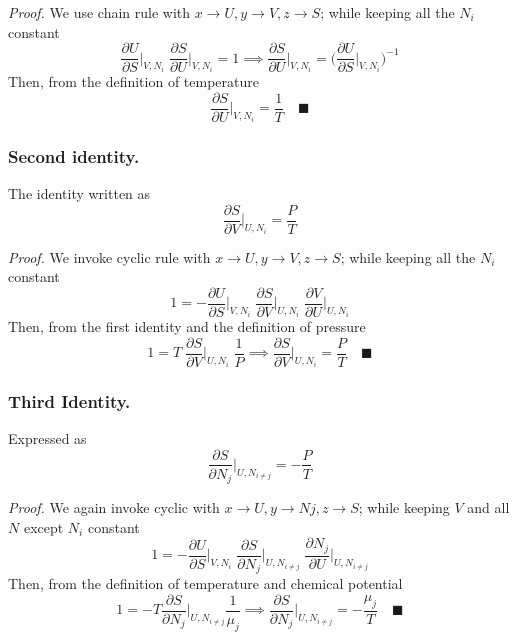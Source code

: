 \documentclass[../../../main.tex]{subfiles}
\begin{document}
\emph{Proof.} We use chain rule with $x\rightarrow U,  y \rightarrow V ,z \rightarrow S$; while keeping all the $N_i$ constant
\begin{equation*}
    \frac{\partial U}{\partial S}\bigg|_{V,N_i}\;\frac{\partial S}{\partial U}\bigg|_{V,N_i}=1\implies
    \frac{\partial S}{\partial U}\bigg|_{V,N_i}=\biggl(\frac{\partial U}{\partial S}\bigg|_{V,N_i}\biggr)^{-1}
\end{equation*}
Then, from the definition of temperature
\begin{equation*}
    \frac{\partial S}{\partial U}\bigg|_{V,N_i}=\frac{1}{T}\quad \blacksquare
\end{equation*}

\subsubsection{Second identity.} The identity written as
\begin{equation*}
    \frac{\partial S}{\partial V}\bigg|_{U, N_i}=\frac{P}{T}
\end{equation*}

\emph{Proof.} We invoke cyclic rule with $x \rightarrow U , y \rightarrow V , z \rightarrow S$; while keeping all the $N_i$ constant
\begin{equation*}
    1= -\frac{\partial U}{\partial S}\bigg|_{V,N_{i}} \;\frac{\partial S}{\partial V}\bigg|_{U,N_{i}} \; \frac{\partial V}{\partial U}\bigg|_{U,N_{i}}
\end{equation*}
Then, from the first identity and the definition of pressure
\begin{equation*}
    1= T\;\frac{\partial S}{\partial V}\bigg|_{U,N_{i}} \;\frac{1}{P}\implies
    \frac{\partial S}{\partial V}\bigg|_{U,N_{i}} =\frac{P}{T}\quad \blacksquare
\end{equation*}

\subsubsection{Third Identity.} Expressed as
\begin{equation*}
    \frac{\partial S}{\partial N_j}\bigg|_{U, N_{i\neq j}}=-\frac{P}{T}
\end{equation*}

\emph{Proof.} We again invoke cyclic with $x \rightarrow U , y \rightarrow N j , z \rightarrow S$; while keeping $V$ and all $N$ except $N_{i}$ constant
\begin{equation*}
    1= -\frac{\partial U}{\partial S}\bigg|_{V,N_{i}} \;\frac{\partial S}{\partial N_j}\bigg|_{U,N_{i\neq j}} \; \frac{\partial N_j}{\partial U}\bigg|_{U,N_{i\neq j}}
\end{equation*}
Then, from the definition of temperature and chemical potential
\begin{equation*}
    1= -T\frac{\partial S}{\partial N_j}\bigg|_{U,N_{i\neq j}} \frac{1}{\mu_j}\implies
    \frac{\partial S}{\partial N_j}\bigg|_{U,N_{i\neq j}}=-\frac{\mu_j}{T}\quad \blacksquare
\end{equation*}
\end{document}
